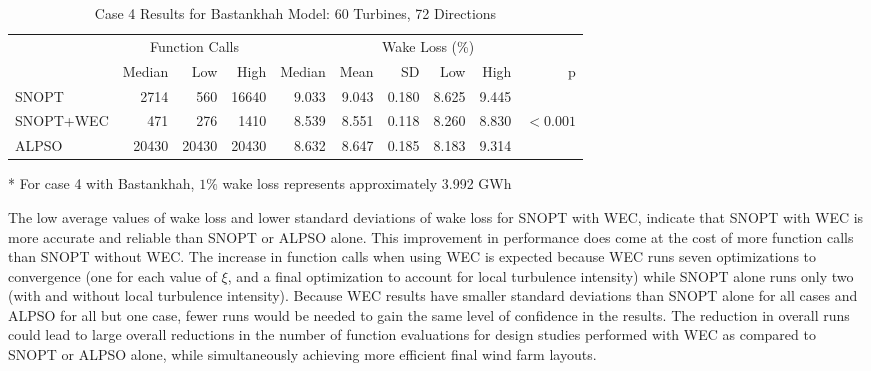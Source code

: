 \documentclass[journal abbreviation, manuscript]{copernicus}
\begin{document}
	\begin{table}
		\centering
		\caption{Case 4 Results for Bastankhah Model: 60 Turbines, 72 Directions}
		\label{tab:case4}
		\begin{threeparttable}
			\begin{tabular}{lrrrrrrrrr}
				\toprule
				{} & \multicolumn{3}{c}{Function Calls} & \multicolumn{6}{c}{Wake Loss (\%)\tnote{*}} \\
				\cmidrule(lr){2-4} \cmidrule(lr){5-10}
				{} &         Median &    Low &   High &        Median &  Mean &    SD &   Low &  High &          p \\
				\cmidrule(lr){2-4} \cmidrule(lr){5-10}
				SNOPT     &           2714 &    560 &  16640 &         9.033 & 9.043 & 0.180 & 8.625 & 9.445 &            \\
				SNOPT+WEC &            471 &    276 &   1410 &         8.539 & 8.551 & 0.118 & 8.260 & 8.830 &  $< 0.001$ \\
				ALPSO     &          20430 &  20430 &  20430 &         8.632 & 8.647 & 0.185 & 8.183 & 9.314 &            \\
				\bottomrule
			\end{tabular}
			\begin{tablenotes}
				\item[*] For case 4 with Bastankhah, $1\%$ wake loss represents approximately 3.992 GWh
			\end{tablenotes}
		\end{threeparttable}
	\end{table}
	
	The low average values of wake loss and lower standard deviations of wake loss for SNOPT with WEC, indicate that SNOPT with WEC is more accurate and reliable than SNOPT or ALPSO alone. This improvement in performance does come at the cost of more function calls than SNOPT without WEC. The increase in function calls when using WEC is expected because WEC runs seven optimizations to convergence (one for each value of $\xi$, and a final optimization to account for local turbulence intensity) while SNOPT alone runs only two (with and without local turbulence intensity). Because WEC results have smaller standard deviations than SNOPT alone for all cases and ALPSO for all but one case, fewer runs would be needed to gain the same level of confidence in the results. The reduction in overall runs could lead to large overall reductions in the number of function evaluations for design studies performed with WEC as compared to SNOPT or ALPSO alone, while simultaneously achieving more efficient final wind farm layouts.
	
\end{document}
